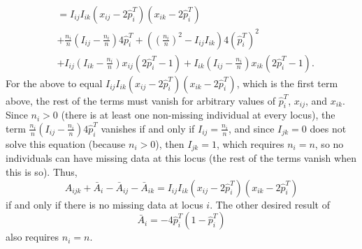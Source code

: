 \documentclass[9pt,twocolumn,twoside]{gsajnl}
\newcommand{\xij}[1][j]{x_{i#1}}
\newcommand{\pith}{\hat{p}_i^T}
\begin{document}
\begin{appendices}
\begin{align*}
    &=
      I_{ij} I_{ik} \left( \xij - 2 \pith \right) \left( \xij[k] - 2 \pith \right)
    \\
      &+ \frac{n_i}{n} \left( I_{ij} - \frac{n_i}{n} \right) 4 \pith
        + \left( \left( \frac{n_i}{n} \right)^2 -  I_{ij} I_{ik} \right) 4 \left( \pith \right)^2
    \\
      &+ I_{ij} \left( I_{ik} - \frac{n_i}{n} \right) \xij \left( 2 \pith - 1 \right)
      + I_{ik} \left( I_{ij} - \frac{n_i}{n} \right) \xij[k] \left( 2 \pith - 1 \right)
      .
  \end{align*}
  For the above to equal $I_{ij} I_{ik} \left( \xij - 2 \pith \right) \left( \xij[k] - 2 \pith \right)$, which is the first term above, the rest of the terms must vanish for arbitrary values of $\pith$, $\xij$, and $\xij[k]$.
  Since $n_i > 0$ (there is at least one non-missing individual at every locus), the term $\frac{n_i}{n} ( I_{ij} - \frac{n_i}{n} ) 4 \pith$ vanishes if and only if $I_{ij} = \frac{n_i}{n}$, and since $I_{jk}=0$ does not solve this equation (because $n_i > 0$), then $I_{jk}=1$, which requires $n_i=n$, so no individuals can have missing data at this locus (the rest of the terms vanish when this is so).
  Thus,
  $$
  A_{ijk} + \bar{A}_i - \bar{A}_{ij}  - \bar{A}_{ik}
  =
  I_{ij} I_{ik} \left( \xij - 2 \pith \right) \left( \xij[k] - 2 \pith \right)
  $$
  if and only if there is no missing data at locus $i$.
  The other desired result of
  $$
  \bar{A}_i
  =
  - 4 \pith \left( 1 - \pith \right)
  $$
  also requires $n_i = n$.


\end{appendices}
\end{document}
